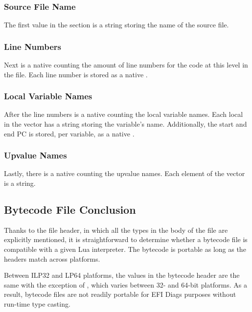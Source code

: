 \subsubsection{Source File Name}

	The first value in the section is a string storing the name of the
	source file.

\subsubsection{Line Numbers}

	Next is a native  counting the amount of line numbers for
	the code at this level in the file.  Each line number is stored as a
	native .

\subsubsection{Local Variable Names}

	After the line numbers is a native  counting the local
	variable names.  Each local in the vector has a string storing the
	variable's name.  Additionally, the start and end PC is stored, per
	variable, as a native .

\subsubsection{Upvalue Names}

	Lastly, there is a native  counting the upvalue names.
	Each element of the vector is a string.

\subsection{Bytecode File Conclusion}

	Thanks to the file header, in which all the types in the body of the
	file are explicitly mentioned, it is straightforward to determine
	whether a bytecode file is compatible with a given Lua interpreter.
	The bytecode is portable as long as the headers match across platforms.

	Between ILP32 and LP64 platforms, the values in the bytecode header are
	the same with the exception of , which varies between
	32- and 64-bit platforms.  As a result, bytecode files are not readily
	portable for EFI Diags purposes without run-time type casting.


